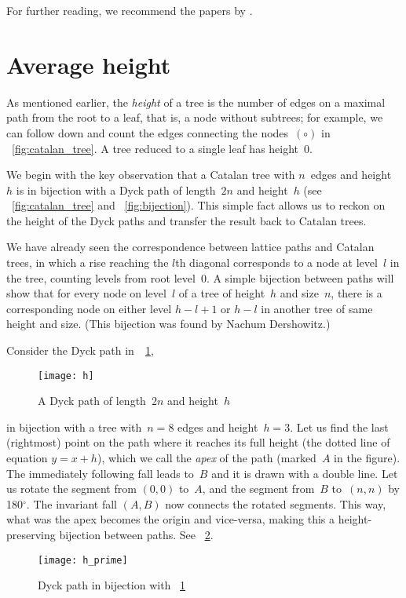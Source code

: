 For further reading, we recommend the papers by
\citet*{DershwowitzZaks_1980,DershowitzZaks_1981,DershowitzZaks_1990}.

\section{Average height}
\label{sec:Catalan_height}

As mentioned earlier, the \emph{height} of a tree is the number of
edges on a maximal path from the root to a leaf, that is, a node
without subtrees; for example, we can follow down and count the edges
connecting the nodes~\((\circ)\) in \fig~\ref{fig:catalan_tree}. A
tree reduced to a single leaf has height~\(0\).

We begin with the key observation that a Catalan tree with \(n\)~edges
and height~\(h\) is in bijection with a Dyck path of length~\(2n\) and
height~\(h\) (see \fig~\vref{fig:catalan_tree} and
\fig~\ref{fig:bijection}). This simple fact allows us to reckon on the
height of the Dyck paths and transfer the result back to Catalan
trees.

We have already seen the correspondence between lattice paths and
Catalan trees, in which a rise reaching the $l$th diagonal corresponds
to a node at level~$l$ in the tree, counting levels from root
level~$0$. A simple bijection between paths will show that for every
node on level~$l$ of a tree of height~$h$ and size~$n$, there is a
corresponding node on either level $h-l+1$ or $h-l$ in another tree of
same height and size. (This bijection was found by Nachum Dershowitz.)

Consider the Dyck path in~\Fig~\ref{fig:h},
\begin{figure}
\centering
\texttt{[image: h]}
\caption{A Dyck path of length~\(2n\) and height~\(h\)\label{fig:h}}
\end{figure}
in bijection with a tree with~\(n=8\) edges and height~\(h=3\). Let us
find the last (rightmost) point on the path where it reaches its full
height (the dotted line of equation \(y = x + h\)), which we call the
\emph{apex} of the path (marked~$A$ in the figure). The immediately
following fall leads to~$B$ and it is drawn with a double line. Let us
rotate the segment from $(0,0)$ to~$A$, and the segment from~$B$
to~$(n,n)$ by 180$^\circ$. The invariant fall $(A,B)$ now connects the
rotated segments. This way, what was the apex becomes the origin and
vice\hyp{}versa, making this a height\hyp{}preserving bijection
between paths. See \fig~\ref{fig:h_prime}.
\begin{figure}
\centering
\texttt{[image: h\_prime]}
\caption{Dyck path in bijection with \fig~\ref{fig:h}
\label{fig:h_prime}}
\end{figure}

